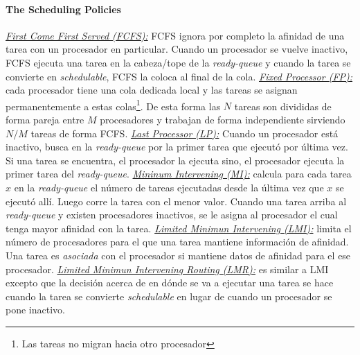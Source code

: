 \paragraph{\textnormal{\textbf{The Scheduling Policies}}}
\underline{\textit{First Come First Served (FCFS):}} FCFS ignora por completo la afinidad de una tarea con un procesador en particular. Cuando un procesador se vuelve inactivo, FCFS ejecuta una tarea en la cabeza/tope de la \textit{ready-queue} y cuando la tarea se convierte en \textit{schedulable}, FCFS la coloca al final de la cola. \underline{\textit{Fixed Processor (FP):}} cada procesador tiene una cola dedicada local y las tareas se asignan permanentemente a estas colas\footnote{Las tareas no migran hacia otro procesador}. De esta forma las $N$ tareas son divididas de forma pareja entre $M$ procesadores y trabajan de forma independiente sirviendo $N/M$ tareas de forma FCFS. \underline{\textit{Last Processor (LP):}} Cuando un procesador está inactivo, busca en la \textit{ready-queue} por la primer tarea que ejecutó por última vez. Si una tarea se encuentra, el procesador la ejecuta sino, el procesador ejecuta la primer tarea del \textit{ready-queue}. \underline{\textit{Mininum Intervening (MI):}} calcula para cada tarea $x$ en la \textit{ready-queue} el número de tareas ejecutadas desde la última vez que $x$ se ejecutó allí. Luego corre la tarea con el menor valor. Cuando una tarea arriba al \textit{ready-queue} y existen procesadores inactivos, se le asigna al procesador el cual tenga mayor afinidad con la tarea. \underline{\textit{Limited Minimun Intervening (LMI):}} limita el número de procesadores para el que una tarea mantiene información de afinidad. Una tarea es \textit{asociada} con el procesador si mantiene datos de afinidad para el ese procesador. \underline{\textit{Limited Minimun Intervening Routing (LMR):}} es similar a LMI excepto que la decisión acerca de en dónde se va a ejecutar una tarea se hace cuando la tarea se convierte \textit{schedulable} en lugar de cuando un procesador se pone inactivo.

